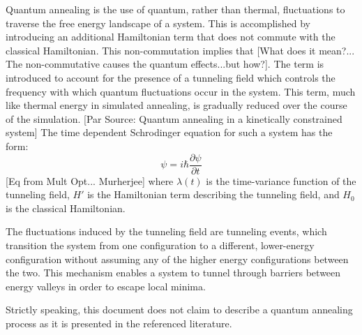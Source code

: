 \documentclass[11pt]{afthesis}
\begin{document}
Quantum annealing is the use of quantum, rather than thermal, fluctuations to traverse the free energy landscape of a system. This is accomplished by introducing an additional Hamiltonian term that does not commute with the classical Hamiltonian. This non-commutation implies that [What does it mean?... The non-commutative causes the quantum effects...but how?].  The term is introduced to account for the presence of a tunneling field which controls the frequency with which quantum fluctuations occur in the system. This term, much like thermal energy in simulated annealing, is gradually reduced over the course of the simulation. [Par Source: Quantum annealing in a kinetically constrained system] The time dependent Schrodinger equation for such a system has the form: \begin{equation}
[\lambda(t)H' + H_0]\psi = i\hbar \frac{\partial \psi}{\partial t}
\end{equation} [Eq from Mult Opt... Murherjee] where \begin{math} \lambda(t) \end{math} is the time-variance function of the tunneling field, \begin{math} H' \end{math} is the Hamiltonian term describing the tunneling field, and \begin{math} H_0 \end{math} is the classical Hamiltonian.

The fluctuations induced by the tunneling field are tunneling events, which transition the system from one configuration to a different, lower-energy configuration without assuming any of the higher energy configurations between the two. This mechanism enables a system to tunnel through barriers between energy valleys in order to escape local minima. 

Strictly speaking, this document does not claim to describe a quantum annealing process as it is presented in the referenced literature. 



\end{document}
